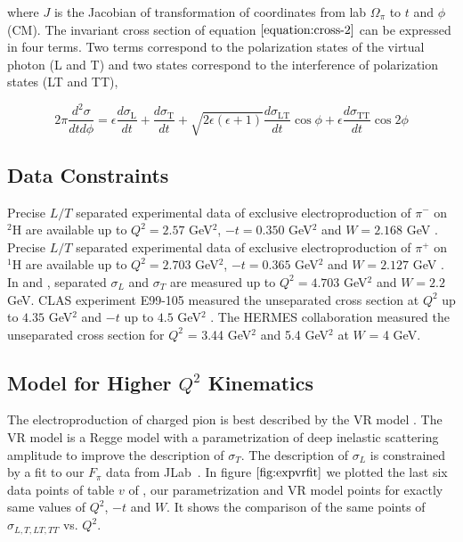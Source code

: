 where $J$ is the Jacobian of transformation of coordinates from lab $\Omega_{\pi}$ to $t$ and $\phi$ (CM). The invariant cross section 
of equation $\ref{equation:cross-2}$ can be expressed in four terms. Two terms correspond to the polarization states of the virtual 
photon (L and T) and two states correspond to the interference of polarization states (LT and TT),

\begin{equation}
  2\pi \frac{d^2 \sigma}{dt d\phi} =  \epsilon  \frac{d\sigma_{\mathrm{L}}}{dt} + \frac{d\sigma_{\mathrm{T}}}{dt} + 
  \sqrt{2\epsilon (\epsilon +1)} \frac{d\sigma_{\mathrm{LT}}}{dt} \cos{\phi} + \epsilon  \frac{d\sigma_{\mathrm{TT}}}{dt} \cos{2 \phi}
  \label{equation:cross-3}
\end{equation}

\subsection{Data Constraints}
\label{dataconstraints}
Precise $L/T$ separated experimental data of exclusive electroproduction of $\pi^{-}$ on $^2$H are available up to $Q^2 = 2.57$ GeV$^2$, 
$-t = 0.350$ GeV$^2$ and $W = 2.168$ GeV \cite{gmhuber-2}. Precise $L/T$ separated experimental data of exclusive electroproduction 
of $\pi^{+}$ on $^1$H are available up to $Q^2 = 2.703$ GeV$^2$, $-t = 0.365$ GeV$^2$ and $W = 2.127$ GeV \cite{gmhuber}. In \cite{hallc-1} 
and \cite{hallc-2}, separated $\sigma_{L}$ and $\sigma_{T}$ are measured up to $Q^2 = 4.703$ GeV$^2$ and $W = 2.2$ GeV. CLAS 
experiment E99-105 measured the unseparated cross section at $Q^2$ up to $4.35$ GeV$^2$ and $-t$ up to $4.5$ GeV$^2$ \cite{park}. 
The HERMES collaboration measured the unseparated cross section for $Q^2$ = 3.44 GeV$^2$ and 5.4 GeV$^2$ \cite{hermes} at $W$ = 4 
GeV. 

\subsection{Model for Higher $Q^2$ Kinematics}
The electroproduction of charged pion is best described by the VR model \cite{vr}. The VR model is a 
Regge model with a parametrization of deep inelastic scattering amplitude to improve the description of $\sigma_{T}$. The 
description of $\sigma_{L}$ is constrained by a fit to our $F_{\pi}$ data from JLab~\cite{gmhuber}. In figure $\ref{fig:expvrfit}$ we plotted the 
last six data points of table $v$ of \cite{gmhuber-2}, our parametrization and VR model points for exactly same 
values of $Q^2$, $-t$ and $W$. It shows the comparison of the same points of $\sigma_{L,T,LT,TT}$ vs. $Q^{2}$. 


